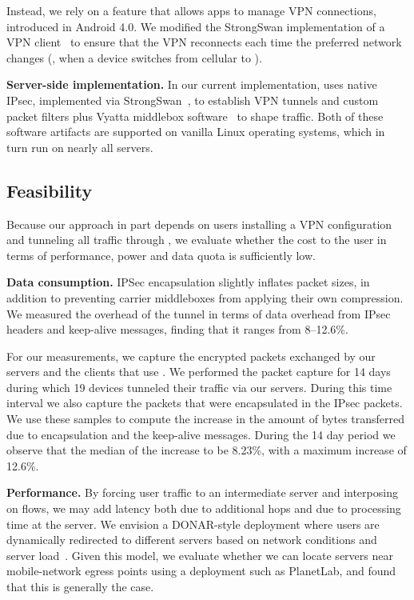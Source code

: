 Instead, we rely on a feature that allows apps to manage VPN connections, 
introduced in Android 4.0. We modified the StrongSwan implementation of 
a VPN client~\cite{strongswanclient} to ensure that the VPN reconnects each time the preferred 
network changes (\eg, when a device switches from cellular to \wifi). 

\noindent\textbf{Server-side implementation.} In our current implementation, \meddle 
uses native IPsec, implemented via StrongSwan~\cite{strongswan}, to establish VPN tunnels 
and custom packet filters plus Vyatta middlebox software~\cite{vyatta} to shape
traffic. Both of these software artifacts are supported on vanilla
Linux operating systems, which in turn run on nearly all servers. 
   
\subsection{Feasibility}
\label{subsec:cost}
Because our approach in part depends on users installing a VPN configuration and tunneling all traffic through \meddle, we evaluate whether the cost to the user in terms of performance, power and data quota is sufficiently low.
  
\noindent\textbf{Data consumption.} IPSec encapsulation slightly inflates packet sizes, in addition to 
preventing carrier middleboxes from applying their own compression. We measured the overhead 
of the tunnel in terms of data overhead from IPsec headers and keep-alive messages, finding that it 
ranges from 8--12.6\%. 

For our measurements, we capture the encrypted packets exchanged by 
our \meddle servers and the clients that use \meddle. We performed the packet capture for 14 days 
during which 19 devices tunneled their traffic via our \meddle servers. During this time interval we 
also capture the packets that were encapsulated in the IPsec packets. We use these samples to 
compute the increase in the amount of bytes transferred due to encapsulation and the keep-alive 
messages. During the 14 day period we observe that the median of the increase to be 8.23\%, 
with a maximum increase of 12.6\%.

\noindent\textbf{Performance.} By forcing user traffic to an
intermediate server and interposing on flows, we may add latency both
due to additional hops and due to processing time at the \meddle
server. We envision a DONAR-style deployment where users are
dynamically redirected to different \meddle servers based on network
conditions and server load~\cite{wendell:donar}. Given this model, we
evaluate whether we can locate servers near mobile-network egress
points using a deployment such as PlanetLab, and found that this is
generally the case.


